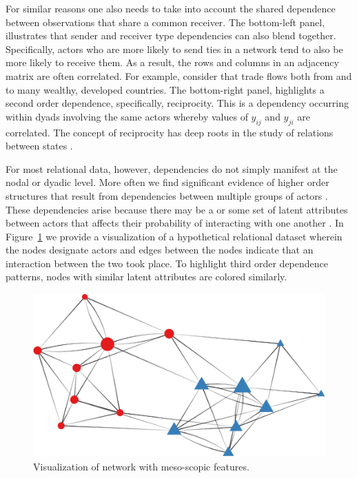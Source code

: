 For similar reasons one also needs to take into account the shared dependence between observations that share a common receiver. The bottom-left panel, illustrates that sender and receiver type dependencies can also blend together. Specifically, actors who are more likely to send ties in a network tend to also be more likely to receive them. As a result, the rows and columns in an adjacency matrix are often correlated. For example, consider that trade flows both from and to many wealthy, developed countries. The bottom-right panel, highlights a second order dependence, specifically, reciprocity. This is a dependency occurring within dyads involving the same actors whereby values of $y_{ij}$ and $y_{ji}$ are correlated. The concept of reciprocity has deep roots in the study of relations between states \citep{richardson:1960,keohane:1989}. 

For most relational data, however, dependencies do not simply manifest at the nodal or dyadic level. More often we find significant evidence of higher order structures that result from dependencies between multiple groups of actors \citep{poast:2010}. These dependencies arise because there may be a or some set of latent attributes between actors that affects their probability of interacting with one another \citep{zinnes:1967,wasserman:faust:1994}. In Figure~\ref{fig:thirdDeps} we provide a visualization of a hypothetical relational dataset wherein the nodes designate actors and edges between the nodes indicate that an interaction between the two took place. To highlight third order dependence patterns, nodes with similar latent attributes are colored similarly.

\begin{figure}[ht]
	\includegraphics[width=.6\textwidth]{stochEquiv_v2.pdf}
	\caption{Visualization of network with meso-scopic features.}
	\label{fig:thirdDeps}
\end{figure}


